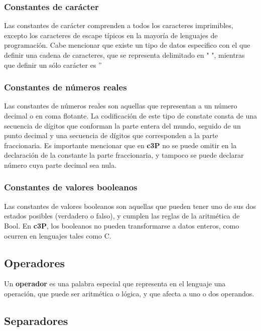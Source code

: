 \subsubsection{Constantes de carácter}

Las constantes de carácter comprenden a todos los caracteres imprimibles, excepto los
caracteres de escape típicos en la mayoría de lenguajes de programación. Cabe mencionar
que existe un tipo de datos especifico con el que definir una cadena de caracteres,
que se representa delimitado en " ", mientras que definir un sólo carácter es  ''

\subsubsection{Constantes de números reales}

Las constantes de números reales son aquellas que representan a un número decimal o
en coma flotante. La codificación de este tipo de constate consta de una secuencia
de dígitos que conforman la parte entera del mundo, seguido de un punto decimal y
una secuencia de dígitos que corresponden a la parte fraccionaria. Es importante
mencionar que en \textbf{c3P} no se puede omitir en la declaración de la constante
la parte fraccionaria, y tampoco se puede declarar número cuya parte decimal sea nula.

\subsubsection{Constantes de valores booleanos}

Las constantes de valores booleanos son aquellas que pueden tener uno de sus
dos estados posibles (verdadero o falso), y cumplen las reglas de la aritmética
de Bool. En \textbf{c3P}, los booleanos no pueden transformarse a datos enteros,
como ocurren en lenguajes tales como C.

\subsection{Operadores}

Un \textbf{operador} es una palabra especial que representa en el lenguaje una operación,
que puede ser aritmética o lógica, y que afecta a uno o dos operandos.

\subsection{Separadores}

